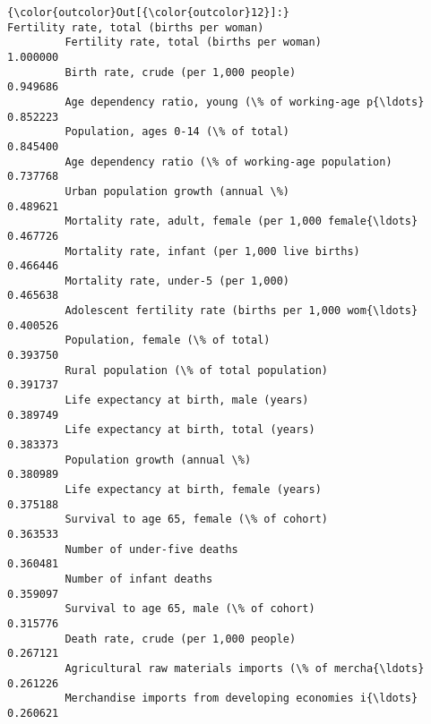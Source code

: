 \documentclass[11pt]{article}
\begin{document}
\begin{Verbatim}[commandchars=\\\{\}]
{\color{outcolor}Out[{\color{outcolor}12}]:}                                                     Fertility rate, total (births per woman)
         Fertility rate, total (births per woman)                                            1.000000
         Birth rate, crude (per 1,000 people)                                                0.949686
         Age dependency ratio, young (\% of working-age p{\ldots}                                  0.852223
         Population, ages 0-14 (\% of total)                                                  0.845400
         Age dependency ratio (\% of working-age population)                                  0.737768
         Urban population growth (annual \%)                                                  0.489621
         Mortality rate, adult, female (per 1,000 female{\ldots}                                  0.467726
         Mortality rate, infant (per 1,000 live births)                                      0.466446
         Mortality rate, under-5 (per 1,000)                                                 0.465638
         Adolescent fertility rate (births per 1,000 wom{\ldots}                                  0.400526
         Population, female (\% of total)                                                     0.393750
         Rural population (\% of total population)                                            0.391737
         Life expectancy at birth, male (years)                                              0.389749
         Life expectancy at birth, total (years)                                             0.383373
         Population growth (annual \%)                                                        0.380989
         Life expectancy at birth, female (years)                                            0.375188
         Survival to age 65, female (\% of cohort)                                            0.363533
         Number of under-five deaths                                                         0.360481
         Number of infant deaths                                                             0.359097
         Survival to age 65, male (\% of cohort)                                              0.315776
         Death rate, crude (per 1,000 people)                                                0.267121
         Agricultural raw materials imports (\% of mercha{\ldots}                                  0.261226
         Merchandise imports from developing economies i{\ldots}                                  0.260621

\end{Verbatim}
\end{document}
